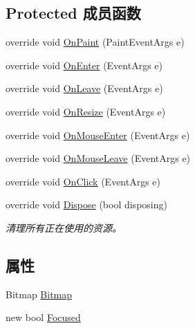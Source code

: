 \subsection*{Protected 成员函数}
\begin{DoxyCompactItemize}
\item 
override void \hyperlink{classcustom__cloud_1_1_glass_button_a57617c555c981155de73e7b3b15611ce}{On\+Paint} (Paint\+Event\+Args e)
\item 
override void \hyperlink{classcustom__cloud_1_1_glass_button_aad59e1dff68329c4cce5fff6673bf3ba}{On\+Enter} (Event\+Args e)
\item 
override void \hyperlink{classcustom__cloud_1_1_glass_button_adab55eb2072a2b3ae485067887bddbac}{On\+Leave} (Event\+Args e)
\item 
override void \hyperlink{classcustom__cloud_1_1_glass_button_ac22aaad10c50ff8e2f2712cc04a87a43}{On\+Resize} (Event\+Args e)
\item 
override void \hyperlink{classcustom__cloud_1_1_glass_button_a8febcfc1f5681f8853e249c04a4f699a}{On\+Mouse\+Enter} (Event\+Args e)
\item 
override void \hyperlink{classcustom__cloud_1_1_glass_button_a48acc39fd8a729694a1dbd9332808a63}{On\+Mouse\+Leave} (Event\+Args e)
\item 
override void \hyperlink{classcustom__cloud_1_1_glass_button_af6313e7db824450759b184b5d159427d}{On\+Click} (Event\+Args e)
\item 
override void \hyperlink{classcustom__cloud_1_1_glass_button_a74709d91e35a65faa66f9001e47f462f}{Dispose} (bool disposing)
\begin{DoxyCompactList}\small\item\em 清理所有正在使用的资源。 \end{DoxyCompactList}\end{DoxyCompactItemize}
\subsection*{属性}
\begin{DoxyCompactItemize}
\item 
Bitmap \hyperlink{classcustom__cloud_1_1_glass_button_a8c1e11783aa485f2b32c29e276a0a19b}{Bitmap}
\item 
new bool \hyperlink{classcustom__cloud_1_1_glass_button_ad98d286587f223573b85ac5c0c8af88c}{Focused}
\end{DoxyCompactItemize}


